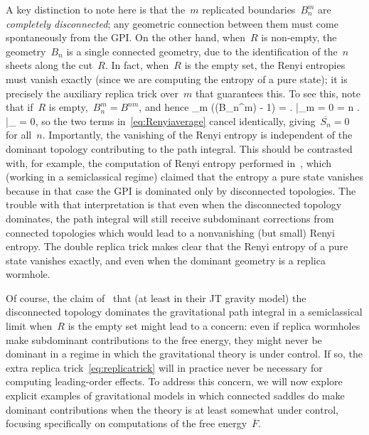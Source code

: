 \documentclass[12pt]{article}
\begin{document}
A key distinction to note here is that the~$m$ replicated boundaries~$B_n^m$ are \textit{completely disconnected}; any geometric connection between them must come spontaneously from the GPI.  On the other hand, when~$R$ is non-empty, the geometry~$B_n$ is a single connected geometry, due to the identification of the~$n$ sheets along the cut~$R$.  In fact, when~$R$ is the empty set, the Renyi entropies must vanish exactly (since we are computing the entropy of a pure state); it is precisely the auxiliary replica trick over~$m$ that guarantees this.  To see this, note that if~$R$ is empty,~$B_n^m = B^{nm}$, and hence
\be
\lim_{m }  \left(\Pcal(B_n^m) - 1\right) = \left. \right|_{m = 0} = n \left.  \right|_{ = 0},
\ee
so the two terms in~\eqref{eq:Renyiaverage} cancel identically, giving~$\overline{S_n} = 0$ for all~$n$.  Importantly, the vanishing of the Renyi entropy is independent of the dominant topology contributing to the path integral.  This should be contrasted with, for example, the computation of Renyi entropy performed in~\cite{AlmHar19}, which (working in a semiclassical regime) claimed that the entropy a pure state vanishes because in that case the GPI is dominated only by disconnected topologies.  The trouble with that interpretation is that even when the disconnected topology dominates, the path integral will still receive subdominant corrections from connected topologies which would lead to a nonvanishing (but small) Renyi entropy.  The double replica trick makes clear that the Renyi entropy of a pure state vanishes exactly, and even when the dominant geometry is a replica wormhole.

Of course, the claim of~\cite{AlmHar19} that (at least in their JT gravity model) the disconnected topology dominates the gravitational path integral in a semiclassical limit when~$R$ is the empty set might lead to a concern: even if replica wormholes make subdominant contributions to the free energy, they might never be dominant in a regime in which the gravitational theory is under control.  If so, the extra replica trick~\eqref{eq:replicatrick} will in practice never be necessary for computing leading-order effects.  To address this concern, we will now explore explicit examples of gravitational models in which connected saddles do make dominant contributions when the theory is at least somewhat under control, focusing specifically on computations of the free energy~$\overline{F}$.
\end{document}
